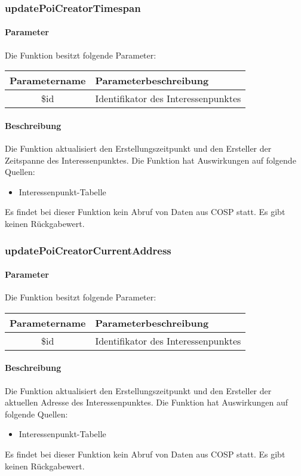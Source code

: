 \subsubsection{updatePoiCreatorTimespan}
\paragraph{Parameter} Die Funktion besitzt folgende Parameter:
\begin{table}[H]
	\begin{tabular}{|c|p{11cm}|}
		\hline
		\textbf{Parametername} & \textbf{Parameterbeschreibung} \\ \hline
		\$id & Identifikator des Interessenpunktes \\ \hline
	\end{tabular}
\end{table}
\paragraph{Beschreibung} Die Funktion aktualisiert den Erstellungszeitpunkt und den Ersteller der Zeitspanne des Interessenpunktes. Die Funktion hat Auswirkungen auf folgende Quellen:
\begin{itemize}
	\item Interessenpunkt-Tabelle
\end{itemize}
Es findet bei dieser Funktion kein Abruf von Daten aus {\glqq COSP\grqq} statt. Es gibt keinen Rückgabewert.
\subsubsection{updatePoiCreatorCurrentAddress}
\paragraph{Parameter} Die Funktion besitzt folgende Parameter:
\begin{table}[H]
	\begin{tabular}{|c|p{11cm}|}
		\hline
		\textbf{Parametername} & \textbf{Parameterbeschreibung} \\ \hline
		\$id & Identifikator des Interessenpunktes \\ \hline
	\end{tabular}
\end{table}
\paragraph{Beschreibung} Die Funktion aktualisiert den Erstellungszeitpunkt und den Ersteller der aktuellen Adresse des Interessenpunktes. Die Funktion hat Auswirkungen auf folgende Quellen:
\begin{itemize}
	\item Interessenpunkt-Tabelle
\end{itemize}
Es findet bei dieser Funktion kein Abruf von Daten aus {\glqq COSP\grqq} statt. Es gibt keinen Rückgabewert.
